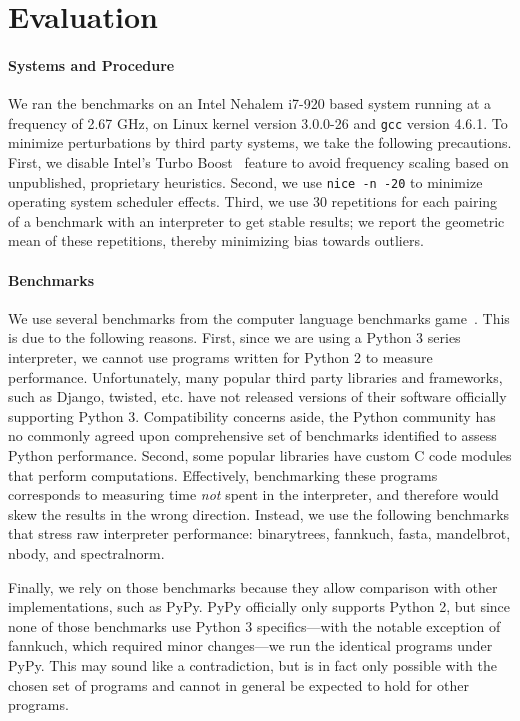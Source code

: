 \documentclass[preprint,10pt]{popl14conf}
\begin{document}
\section{Evaluation}\label{s:evaluation}

\paragraph{Systems and Procedure}
We ran the benchmarks on an Intel Nehalem i7-920 based system running at a frequency of 2.67 GHz, on
Linux kernel version 3.0.0-26 and \texttt{gcc} version 4.6.1.
To minimize perturbations by third party systems, we take the following precautions.
First, we disable Intel's Turbo Boost~\cite{intel+13a} feature to avoid frequency scaling based on
unpublished, proprietary heuristics.
Second, we use \texttt{nice -n -20} to minimize operating system scheduler effects.
Third, we use 30 repetitions for each pairing of a benchmark with an interpreter to get stable
results; we report the geometric mean of these repetitions, thereby minimizing bias towards
outliers.

\paragraph{Benchmarks}
We use several benchmarks from the computer language benchmarks game~\cite{fulgham+13}.
This is due to the following reasons.
First, since we are using a Python 3 series interpreter, we cannot use programs written for Python 2
to measure performance.
Unfortunately, many popular third party libraries and frameworks, such as Django, twisted,
etc. have not released versions of their software officially supporting Python 3.
Compatibility concerns aside, the Python community has no commonly agreed upon comprehensive
set of benchmarks identified to assess Python performance.
Second, some popular libraries have custom C code modules that perform computations.
Effectively, benchmarking these programs corresponds to measuring time \emph{not} spent in the
interpreter, and therefore would skew the results in the wrong direction.
Instead, we use the following benchmarks that stress raw interpreter performance:
\textsf{binarytrees},
\textsf{fannkuch},
\textsf{fasta},
\textsf{mandelbrot},
\textsf{nbody}, and
\textsf{spectralnorm}.

Finally, we rely on those benchmarks because they allow comparison with other implementations, such
as PyPy.
PyPy officially only supports Python 2, but since none of those benchmarks use Python 3
specifics---with the notable exception of \textsf{fannkuch}, which required minor changes---we run
the identical programs under PyPy.
This may sound like a contradiction, but is in fact only possible with the chosen set of programs
and cannot in general be expected to hold for other programs.
\end{document}
